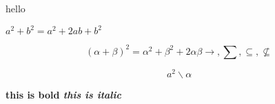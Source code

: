 \documentclass {book}
\begin{document}
hello

$a^2 + b^2 = a^2 + 2ab + b^2 $ 

\begin{equation}
(\alpha +  \beta)^2 = \alpha^2 + \beta^2 + 2\alpha\beta
\longrightarrow, \sum, \subseteq, \not\subseteq
\end{equation}

$$
a^2 \backslash \alpha
$$

\bf this is bold \it this is italic
\end{document}
